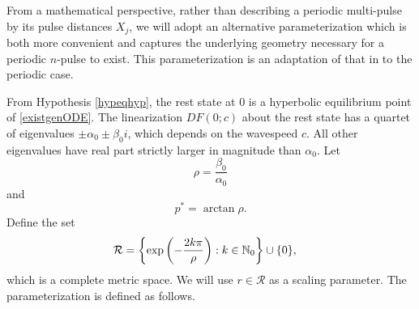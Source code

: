 \documentclass[thesis.tex]{subfiles}
\begin{document}
From a mathematical perspective, rather than describing a periodic multi-pulse by its pulse distances $X_j$, we will adopt an alternative parameterization which is both more convenient and captures the underlying geometry necessary for a periodic $n$-pulse to exist. This parameterization is an adaptation of that in \cite{SandstedeStrut,Sandstede1998} to the periodic case. 

From Hypothesis \ref{hypeqhyp}, the rest state at 0 is a hyperbolic equilibrium point of \cref{existgenODE}. The linearization $DF(0; c)$ about the rest state has a quartet of eigenvalues $\pm \alpha_0 \pm \beta_0 i$, which depends on the wavespeed $c$. All other eigenvalues have real part strictly larger in magnitude than $\alpha_0$. Let
\begin{equation}\label{defrho}
\rho = \frac{\beta_0}{\alpha_0}
\end{equation}
and
\begin{equation}\label{pstar}
p^* = \arctan \rho.
\end{equation}
Define the set
\begin{align}
\mathcal{R} &= \left\{ \mathop\mathrm{exp}\nolimits\left(-\frac{2 k \pi}{\rho}\right) : k \in \mathbb{N}_0 \right\} \cup \{ 0 \},
\end{align}
which is a complete metric space. We will use $r \in \mathcal{R}$ as a scaling parameter. The parameterization is defined as follows.
\end{document}
